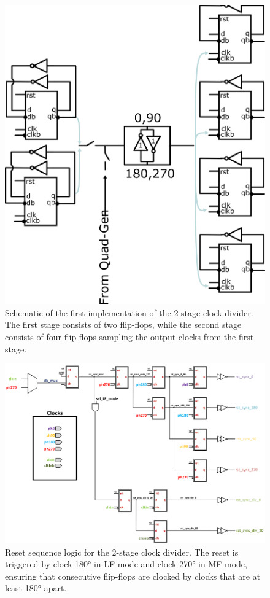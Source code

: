 \begin{figure}[htbp]
  \centering
  \includegraphics[width=0.5\linewidth]{figures/Schematics/2stage_divider.png}
  \caption{Schematic of the first implementation of the 2-stage clock divider. The first stage consists of two flip-flops, while the second stage consists of four flip-flops sampling the output clocks from the first stage.}
  \label{fig:2stage_divider}
\end{figure}

\begin{figure}[htbp]
  \centering
  \includegraphics[width=\linewidth]{figures/Schematics/reset_seq.png}
  \caption{Reset sequence logic for the 2-stage clock divider. The reset is triggered by clock \ang{180} in LF mode and clock \ang{270} in MF mode, ensuring that consecutive flip-flops are clocked by clocks that are at least \ang{180} apart.}
  \label{fig:reset_seq}
\end{figure}